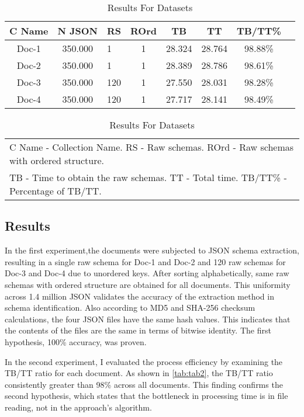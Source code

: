 \documentclass[sigconf, nonacm]{acmart}
\begin{document}
\begin{table}
  \caption{Results For  Datasets}
  \label{tab:tab2}
  \begin{tabular}{c c l c c c c c}
    \toprule
    \small C Name & \small N JSON & \small RS & \small ROrd& \small TB& \small TT & \small TB/TT\% \\
    \midrule
    \small Doc-1 & \small 350.000 & \small 1 & \small 1 & \small 28.324 & \small 28.764 & \small 98.88\% \\
    \small Doc-2 & \small 350.000 & \small 1 & \small 1 & \small 28.389 & \small 28.786 & \small 98.61\% \\
    \small Doc-3 & \small 350.000 & \small 120 & \small 1 & \small 27.550 & \small 28.031 & \small 98.28\% \\
    \small Doc-4 & \small 350.000 & \small 120 & \small 1 & \small 27.717 & \small 28.141 & \small 98.49\% \\
    \bottomrule
  \end{tabular}
  \smallskip
\begin{tabular}{l}
  \tiny 
  C Name - Collection Name. RS - Raw schemas. ROrd - Raw schemas with ordered structure. \\
  \tiny  
  TB - Time to obtain the raw schemas. TT - Total time. TB/TT\% - Percentage of TB/TT.
\end{tabular}
\end{table}

\subsection{Results}
In the first experiment,the documents were subjected to JSON schema extraction, resulting in a single raw schema for Doc-1 and Doc-2 and 120 raw schemas for Doc-3 and Doc-4 due to unordered keys. After sorting alphabetically, same raw schemas with ordered structure are obtained for all documents. This uniformity across 1.4 million JSON validates the accuracy of the extraction method in schema identification. Also according to MD5 and SHA-256 checksum calculations, the four JSON files have the same hash values. This indicates that the contents of the files are the same in terms of bitwise identity. The first hypothesis, 100\% accuracy, was proven.

In the second experiment, I evaluated the process efficiency by examining the TB/TT ratio for each document. As shown in \autoref{tab:tab2}, the TB/TT ratio consistently greater than 98\% across all documents. This finding confirms the second hypothesis, which states that the bottleneck in processing time is in file reading, not in the approach's algorithm.



\end{document}
